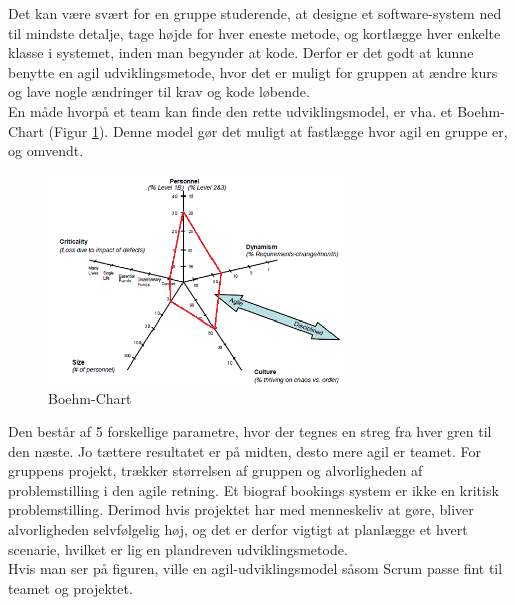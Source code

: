 Det kan være svært for en gruppe studerende, at designe et software-system ned til mindste detalje, 
tage højde for hver eneste metode, og kortlægge hver enkelte klasse i systemet, inden man begynder at kode. 
Derfor er det godt at kunne benytte en agil udviklingsmetode, hvor det er muligt for gruppen at ændre kurs og 
lave nogle ændringer til krav og kode løbende. \\
En måde hvorpå et team kan finde den rette udviklingsmodel, er vha. et Boehm-Chart (Figur \ref{fig:Boehm}). 
Denne model gør det muligt at fastlægge hvor agil en gruppe er, og omvendt. \\

\begin{figure}[h]
    \centering
    \includegraphics[width=0.7\textwidth]{figures/Boehm-chart.png}
    \caption{Boehm-Chart \cite{Boehm}}
    \label{fig:Boehm}
\end{figure}

Den består af 5 forskellige parametre, hvor der tegnes en streg fra hver gren til den næste. 
Jo tættere resultatet er på midten, desto mere agil er teamet. 
For gruppens projekt, trækker størrelsen af gruppen og alvorligheden af problemstilling i den agile retning. 
Et biograf bookings system er ikke en kritisk problemstilling. Derimod hvis projektet har med menneskeliv at gøre, 
bliver alvorligheden selvfølgelig høj, og det er derfor vigtigt at planlægge et hvert scenarie, 
hvilket er lig en plandreven udviklingsmetode.\\

Hvis man ser på figuren, ville en agil-udviklingsmodel såsom Scrum passe fint til teamet og projektet. 
